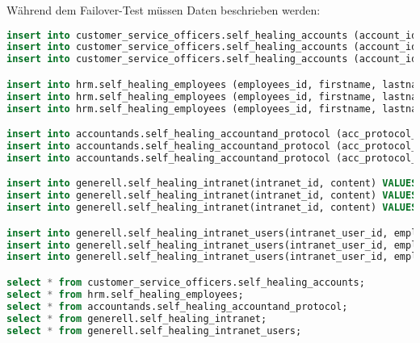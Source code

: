 Während dem Failover-Test müssen Daten beschrieben werden:
\lstset{style=gra_codestyle}
\begin{lstlisting}[language=sql, caption=StackGres-Citus - Self Healing Tests - Failover Data,captionpos=b,label={lst:stackgres_citus-self-healing-failover-data},breaklines=true]
insert into customer_service_officers.self_healing_accounts (account_id, firstname, lastname, birthday) VALUES (400, 'i', 'j', '01.01.2005');
insert into customer_service_officers.self_healing_accounts (account_id, firstname, lastname, birthday) VALUES (500, 'k', 'l', '01.01.2003');
insert into customer_service_officers.self_healing_accounts (account_id, firstname, lastname, birthday) VALUES (600, 'm', 'n', '01.01.2001');

insert into hrm.self_healing_employees (employees_id, firstname, lastname, birthday) VALUES (400, 'i', 'j', '01.01.2005');
insert into hrm.self_healing_employees (employees_id, firstname, lastname, birthday) VALUES (500, 'k', 'l', '01.01.2003');
insert into hrm.self_healing_employees (employees_id, firstname, lastname, birthday) VALUES (600, 'm', 'n', '01.01.2001');

insert into accountands.self_healing_accountand_protocol (acc_protocol_id, description, protocol_date, employees_id, rapport)  values (400, 'bla', '07.04.2024', 200, 'blabla');
insert into accountands.self_healing_accountand_protocol (acc_protocol_id, description, protocol_date, employees_id, rapport)  values (500, 'yada', '07.04.2024', 600, 'ydayadyada');
insert into accountands.self_healing_accountand_protocol (acc_protocol_id, description, protocol_date, employees_id, rapport)  values (1000, 'something', '07.04.2024', 300, 'something');

insert into generell.self_healing_intranet(intranet_id, content) VALUES (200, 'yadada');
insert into generell.self_healing_intranet(intranet_id, content) VALUES (600, 'bla bla');
insert into generell.self_healing_intranet(intranet_id, content) VALUES (900, 'talking and talking');

insert into generell.self_healing_intranet_users(intranet_user_id, employees_id) values(400, 400);
insert into generell.self_healing_intranet_users(intranet_user_id, employees_id) values(500, 500);
insert into generell.self_healing_intranet_users(intranet_user_id, employees_id) values(600, 600);

select * from customer_service_officers.self_healing_accounts;
select * from hrm.self_healing_employees;
select * from accountands.self_healing_accountand_protocol;
select * from generell.self_healing_intranet;
select * from generell.self_healing_intranet_users;
\end{lstlisting}

